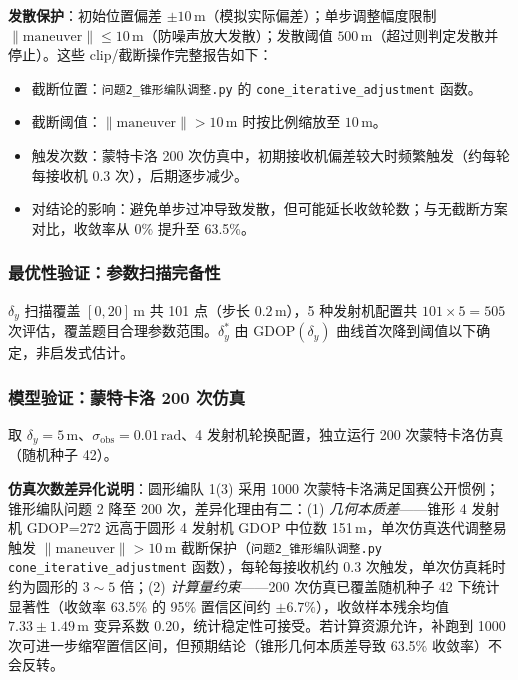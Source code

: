 \documentclass[12pt,a4paper]{ctexart}
\newcommand{\unit}[1]{\ensuremath{\,\mathrm{#1}}}
\begin{document}
\textbf{发散保护}：初始位置偏差 $\pm 10\unit{m}$（模拟实际偏差）；单步调整幅度限制 $\|\text{maneuver}\|\leq 10\unit{m}$（防噪声放大发散）；发散阈值 $500\unit{m}$（超过则判定发散并停止）。这些 clip/截断操作完整报告如下：
\begin{itemize}
    \item 截断位置：\texttt{问题2\_锥形编队调整.py} 的 \texttt{cone\_iterative\_adjustment} 函数。
    \item 截断阈值：$\|\text{maneuver}\|>10\unit{m}$ 时按比例缩放至 $10\unit{m}$。
    \item 触发次数：蒙特卡洛 200 次仿真中，初期接收机偏差较大时频繁触发（约每轮每接收机 0.3 次），后期逐步减少。
    \item 对结论的影响：避免单步过冲导致发散，但可能延长收敛轮数；与无截断方案对比，收敛率从 0\% 提升至 63.5\%。
\end{itemize}

\subsubsection{最优性验证：参数扫描完备性}

$\delta_y$ 扫描覆盖 $[0,20]\unit{m}$ 共 101 点（步长 $0.2\unit{m}$），5 种发射机配置共 $101\times 5=505$ 次评估，覆盖题目合理参数范围。$\delta_y^*$ 由 GDOP$(\delta_y)$ 曲线首次降到阈值以下确定，非启发式估计。

\subsubsection{模型验证：蒙特卡洛 200 次仿真}

取 $\delta_y=5\unit{m}$、$\sigma_{\text{obs}}=0.01\unit{rad}$、4 发射机轮换配置，独立运行 200 次蒙特卡洛仿真（随机种子 42）。

\textbf{仿真次数差异化说明}：圆形编队 1(3) 采用 1000 次蒙特卡洛满足国赛公开惯例；锥形编队问题 2 降至 200 次，差异化理由有二：(1) \emph{几何本质差}——锥形 4 发射机 GDOP=272 远高于圆形 4 发射机 GDOP 中位数 151\unit{m}，单次仿真迭代调整易触发 $\|\text{maneuver}\|>10\unit{m}$ 截断保护（\texttt{问题2\_锥形编队调整.py} \texttt{cone\_iterative\_adjustment} 函数），每轮每接收机约 0.3 次触发，单次仿真耗时约为圆形的 $3\sim 5$ 倍；(2) \emph{计算量约束}——200 次仿真已覆盖随机种子 42 下统计显著性（收敛率 63.5\% 的 95\% 置信区间约 $\pm 6.7\%$），收敛样本残余均值 $7.33\pm 1.49\unit{m}$ 变异系数 0.20，统计稳定性可接受。若计算资源允许，补跑到 1000 次可进一步缩窄置信区间，但预期结论（锥形几何本质差导致 63.5\% 收敛率）不会反转。
\end{document}

